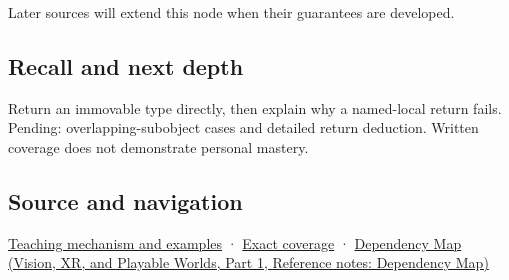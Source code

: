 \hypertarget{appendix-b08d3788c5c6-used-by}{}

Later sources will extend this node when their guarantees are developed.

\subsection{Recall and next depth}\label{appendix-b08d3788c5c6-recall-and-next-depth}

\hypertarget{appendix-b08d3788c5c6-recall-and-next-depth}{}

Return an immovable type directly, then explain why a named-local return fails. Pending: overlapping-subobject cases and detailed return deduction. Written coverage does not demonstrate personal mastery.

\subsection{Source and navigation}\label{appendix-b08d3788c5c6-source-and-navigation}

\hypertarget{appendix-b08d3788c5c6-source-and-navigation}{}

\hyperref[01-foundations-i-ch003-return-a-result-without-handing-out-a-lifetime-problem]{Teaching mechanism and examples} · \hyperref[appendix-fd090d982a15-m009---parts-127-147]{Exact coverage} · \href{../07-Vision-XR-and-Playable-Worlds-P01/main.pdf\#nameddest=appendix-4ad47bdd269a}{Dependency Map (Vision, XR, and Playable Worlds, Part 1, Reference notes: Dependency Map)}

